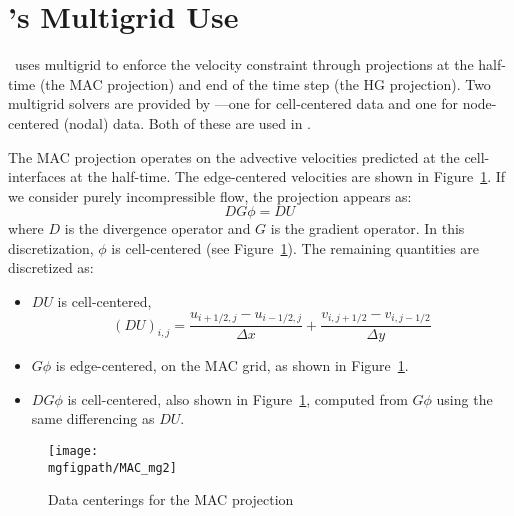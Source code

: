 \section{\maestro's Multigrid Use}

\maestro\ uses multigrid to enforce the velocity constraint through
projections at the half-time (the MAC projection) and end of the time
step (the HG projection).  Two multigrid solvers are provided by
\boxlib---one for cell-centered data and one for node-centered (nodal)
data.  Both of these are used in \maestro.


The MAC projection operates on the advective velocities predicted at
the cell-interfaces at the half-time.  The edge-centered velocities
are shown in Figure~\ref{fig:mg:MAC}.  If we consider purely
incompressible flow, the projection appears as:
\begin{equation}
D G \phi = D U
\end{equation}
where $D$ is the divergence operator and $G$ is the gradient operator.
In this discretization, $\phi$ is cell-centered (see
Figure~\ref{fig:mg:MAC}).  The remaining quantities are discretized as:
\begin{itemize}
\item $DU$ is cell-centered, 
  \begin{equation}
  (DU)_{i,j} = \frac{u_{i+1/2,j} - u_{i-1/2,j}}{\Delta x} + 
               \frac{v_{i,j+1/2} - v_{i,j-1/2}}{\Delta y}
  \end{equation}

\item $G\phi$ is edge-centered, on the MAC grid, as shown in
  Figure~\ref{fig:mg:MAC}.

\item $DG\phi$ is cell-centered, also shown in Figure~\ref{fig:mg:MAC},
  computed from $G\phi$ using the same differencing as $DU$.

\end{itemize}

\begin{figure}[t]
\centering
\texttt{[image: \\mgfigpath/MAC\_mg2]}
\caption{\label{fig:mg:MAC} Data centerings for the MAC projection}
\end{figure}

